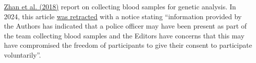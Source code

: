 \documentclass[letterpaper, 12pt]{article}
\begin{document}
\href{https://doi.org/10.1038/s41598-018-22975-6}{Zhan et al. (2018)} report on collecting blood samples for genetic analysis. In 2024, this article \href{https://doi.org/10.1038/s41598-024-64860-5}{was retracted} with a notice stating ``information provided by the Authors has indicated that a police officer may have been present as part of the team collecting blood samples and the Editors have concerns that this may have compromised the freedom of participants to give their consent to participate voluntarily''.

\end{document}
